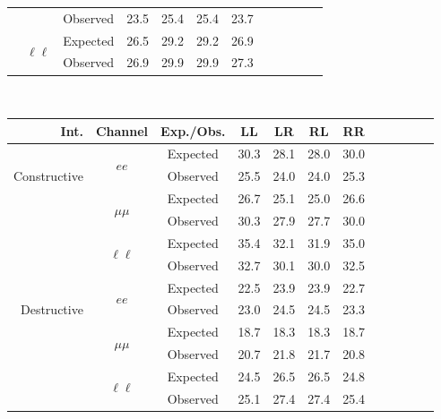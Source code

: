 {\begin{minipage}{\textwidth}
\begin{center}
{\begin{tabular}{r c c c c c c c c c c c}
& & Observed & 23.5 & 25.4 & 25.4 & 23.7 \\
\cmidrule{2-7}
 & \multirow{2}{*}{$\ell\ell$} & Expected & 26.5 & 29.2 & 29.2 & 26.9 \\
& & Observed & 26.9 & 29.9 & 29.9 & 27.3 \\
\bottomrule\end{tabular}}\\
\vspace{1em}
\label{tab:limits_on_lambda_theoryDn}
{\begin{tabular}{r c c c c c c c c c c c}\toprule
Int. & Channel & Exp./Obs. & LL & LR & RL & RR \\
\midrule
\multirow{3}{*}[-1.5em]{\begin{sideways}Constructive\end{sideways}} & \multirow{2}{*}{$ee$} & Expected & 30.3 & 28.1 & 28.0 & 30.0 \\
& & Observed & 25.5 & 24.0 & 24.0 & 25.3 \\
\cmidrule{2-7}
 & \multirow{2}{*}{$\mu\mu$} & Expected & 26.7 & 25.1 & 25.0 & 26.6 \\
& & Observed & 30.3 & 27.9 & 27.7 & 30.0 \\
\cmidrule{2-7}
 & \multirow{2}{*}{$\ell\ell$} & Expected & 35.4 & 32.1 & 31.9 & 35.0 \\
& & Observed & 32.7 & 30.1 & 30.0 & 32.5 \\
\midrule
\multirow{3}{*}[-1.5em]{\begin{sideways}Destructive\end{sideways}} & \multirow{2}{*}{$ee$} & Expected & 22.5 & 23.9 & 23.9 & 22.7 \\
& & Observed & 23.0 & 24.5 & 24.5 & 23.3 \\
\cmidrule{2-7}
 & \multirow{2}{*}{$\mu\mu$} & Expected & 18.7 & 18.3 & 18.3 & 18.7 \\
& & Observed & 20.7 & 21.8 & 21.7 & 20.8 \\
\cmidrule{2-7}
 & \multirow{2}{*}{$\ell\ell$} & Expected & 24.5 & 26.5 & 26.5 & 24.8 \\
& & Observed & 25.1 & 27.4 & 27.4 & 25.4 \\
\bottomrule\end{tabular}} \\
\end{center}
\end{minipage}
\clearpage
}

